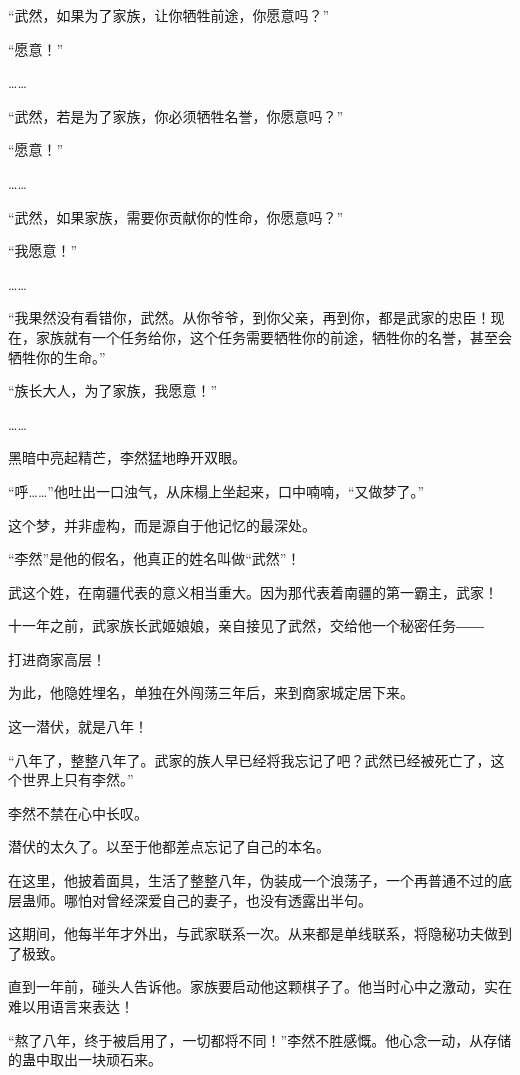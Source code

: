 
\begin{this_body}

“武然，如果为了家族，让你牺牲前途，你愿意吗？”

“愿意！”

……

“武然，若是为了家族，你必须牺牲名誉，你愿意吗？”

“愿意！”

……

“武然，如果家族，需要你贡献你的性命，你愿意吗？”

“我愿意！”

……

“我果然没有看错你，武然。从你爷爷，到你父亲，再到你，都是武家的忠臣！现在，家族就有一个任务给你，这个任务需要牺牲你的前途，牺牲你的名誉，甚至会牺牲你的生命。”

“族长大人，为了家族，我愿意！”

……

黑暗中亮起精芒，李然猛地睁开双眼。

“呼……”他吐出一口浊气，从床榻上坐起来，口中喃喃，“又做梦了。”

这个梦，并非虚构，而是源自于他记忆的最深处。

“李然”是他的假名，他真正的姓名叫做“武然”！

武这个姓，在南疆代表的意义相当重大。因为那代表着南疆的第一霸主，武家！

十一年之前，武家族长武姬娘娘，亲自接见了武然，交给他一个秘密任务――

打进商家高层！

为此，他隐姓埋名，单独在外闯荡三年后，来到商家城定居下来。

这一潜伏，就是八年！

“八年了，整整八年了。武家的族人早已经将我忘记了吧？武然已经被死亡了，这个世界上只有李然。”

李然不禁在心中长叹。

潜伏的太久了。以至于他都差点忘记了自己的本名。

在这里，他披着面具，生活了整整八年，伪装成一个浪荡子，一个再普通不过的底层蛊师。哪怕对曾经深爱自己的妻子，也没有透露出半句。

这期间，他每半年才外出，与武家联系一次。从来都是单线联系，将隐秘功夫做到了极致。

直到一年前，碰头人告诉他。家族要启动他这颗棋子了。他当时心中之激动，实在难以用语言来表达！

“熬了八年，终于被启用了，一切都将不同！”李然不胜感慨。他心念一动，从存储的蛊中取出一块顽石来。


\end{this_body}
